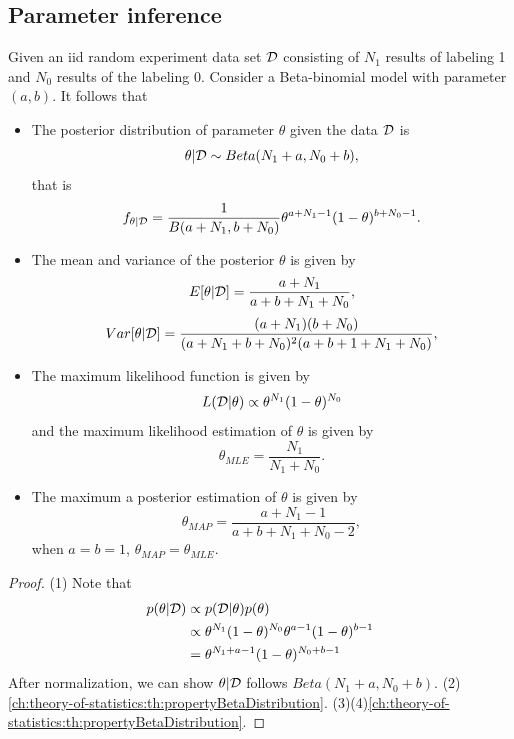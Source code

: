 \begin{refsection}
\subsection{Parameter inference}

\begin{theorem}\cite[75]{murphy2012machine}\label{ch:statistical-learning:th:PosteriorDistributionAndEstimationInBetaBionomialModel}
Given an iid random experiment data set $\mathcal{D}$ consisting of $N_1$ results of labeling 1 and $N_0$ results of the labeling 0. Consider a Beta-binomial model with parameter $(a,b)$. It follows that
\begin{itemize}
	\item The posterior distribution of parameter $\theta$ given the data $\mathcal{D}$ is
	$$\theta|\mathcal{D} \sim Beta(N_1+a,N_0+b),$$
	that is
	$$f_{\theta|\mathcal{D}} = \frac{1}{B(a+N_1,b+N_0)}\theta^{a+N_1-1}(1-\theta)^{b+N_0-1}.$$
	\item The mean and variance of the posterior $\theta$ is given by
	$$E[\theta|\mathcal{D}] = \frac{a + N_1}{a + b + N_1 + N_0},$$
	$$Var[\theta|\mathcal{D}] = \frac{(a + N_1)(b + N_0)}{(a + N_1 + b + N_0)^2(a+b+1 + N_1 + N_0)},$$
	\item The maximum likelihood function is given by
	$$L(\mathcal{D}|\theta) \propto \theta^{N_1}(1-\theta)^{N_0}  $$
	and the maximum likelihood estimation of $\theta$ is given by
	$$\theta_{MLE} = \frac{N_1}{ N_1 + N_0 }.$$
	\item The maximum a posterior estimation of $\theta$ is given by
	 $$\theta_{MAP} = \frac{a+ N_1 - 1}{a + b + N_1 + N_0 -2},$$
	 when $a = b = 1$, $\theta_{MAP} = \theta_{MLE}.$
\end{itemize} 	
\end{theorem}
\begin{proof}
(1)
Note that
\begin{align*}
p(\theta|\mathcal{D}) &\propto p(\mathcal{D}|\theta)p(\theta) \\
 &\propto \theta^{N_1}(1-\theta)^{N_0}\theta^{a-1}(1-\theta)^{b-1} \\
 &=\theta^{N_1+a-1}(1-\theta)^{N_0+b-1} 
\end{align*}
After normalization, we can show $\theta|\mathcal{D}$ follows $Beta(N_1+a,N_0+b)$.
(2)\autoref{ch:theory-of-statistics:th:propertyBetaDistribution}.
(3)(4)\autoref{ch:theory-of-statistics:th:propertyBetaDistribution}.
\end{proof}


\end{refsection}
